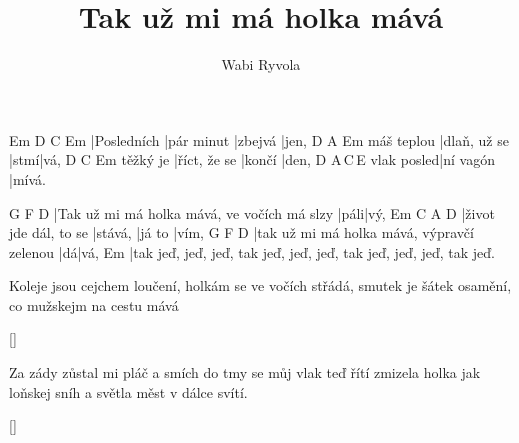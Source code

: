 \documentclass{song}
\author{Wabi Ryvola}
\title{Tak už mi má holka mává}
\begin{document}
\strophe
Em          D          C       Em
|Posledních |pár minut |zbejvá |jen,
           D            A    Em
máš teplou |dlaň, už se |stmí|vá,
         D            C      Em
těžký je |říct, že se |končí |den,
           D         A\,C\,E
vlak posled|ní vagón |mívá.
\endstrophe

G                                           F    D
|Tak už mi má holka mává, ve vočích má slzy |páli|vý,
Em                    C       A\7    D\7
|život jde dál, to se |stává, |já to |vím,
G                                          F  D
|tak už mi má holka mává, výpravčí zelenou |dá|vá,
Em
|tak jeď, jeď, jeď, tak jeď, jeď, jeď, tak jeď, jeď, jeď, tak jeď.
\endstrophe

\strophe*
Koleje jsou cejchem loučení,
holkám se ve vočích střádá,
smutek je šátek osamění,
co mužskejm na cestu mává
\endstrophe

\ref{}

\strophe*
Za zády zůstal mi pláč a smích
do tmy se můj vlak teď řítí
zmizela holka jak loňskej sníh
a světla měst v dálce svítí.
\endstrophe

\ref{}
\end{document}
